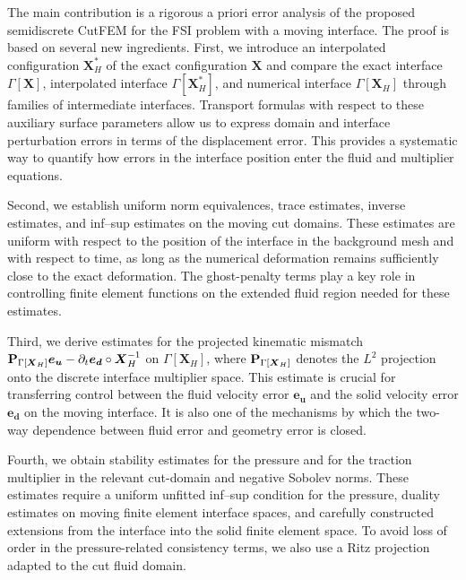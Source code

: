 \documentclass[11pt,reqno]{amsart}
\theoremstyle{definition}
\theoremstyle{plain}
\numberwithin{theorem}{section}
\numberwithin{proposition}{section}
\numberwithin{lemma}{section}
\numberwithin{equation}{section}
\newcommand{\bs}[1]{\boldsymbol{#1}}
\renewcommand{\(}{\bigl(}
\renewcommand{\)}{\bigr)}
\begin{document}
The main contribution is a rigorous a priori error analysis of the proposed semidiscrete CutFEM for the FSI problem with a moving interface.
The proof is based on several new ingredients. First, we introduce an interpolated configuration ${\bs X}_H^*$ of the exact configuration ${\bs X}$ and compare the exact interface $\Gamma[{\bs X}]$, interpolated interface $\Gamma[{\bs X}_H^*]$, and numerical interface $\Gamma[{\bs X}_H]$
through families of intermediate interfaces. Transport formulas with respect to these
auxiliary surface parameters allow us to express domain and interface perturbation errors
in terms of the displacement error. This provides a systematic way to quantify how errors
in the interface position enter the fluid and multiplier equations.

Second, we establish uniform norm equivalences, trace estimates, inverse estimates, and
inf--sup estimates on the moving cut domains. These estimates are uniform with respect
to the position of the interface in the background mesh and with respect to time, as long
as the numerical deformation remains sufficiently close to the exact deformation. The
ghost-penalty terms play a key role in controlling finite element functions on the extended
fluid region needed for these estimates.

Third, we derive estimates for the projected kinematic mismatch 
${\bf P}_{\Gamma[{\bs X}_H]}{\bs e}_{\bs u}
-
\partial_t{\bs e}_{\bs d}\circ{\bs X}_H^{-1}$
on $\Gamma[{\bs X}_H]$, 
where ${\bf P}_{\Gamma[{\bs X}_H]}$ denotes the $L^2$ projection onto the discrete
interface multiplier space. This estimate is crucial for transferring control between the
fluid velocity error ${\bs e}_{\bs u}$ and the solid velocity error ${\bs e}_{\bs d}$ on the moving interface. It is also one of
the mechanisms by which the two-way dependence between fluid error and geometry error
is closed.

Fourth, we obtain stability estimates for the pressure and for the traction multiplier in
the relevant cut-domain and negative Sobolev norms. These estimates require a uniform
unfitted inf--sup condition for the pressure, duality estimates on moving finite element
interface spaces, and carefully constructed extensions from the interface into the solid
finite element space. To avoid loss of order in the pressure-related consistency terms, we
also use a Ritz projection adapted to the cut fluid domain.
\end{document}
